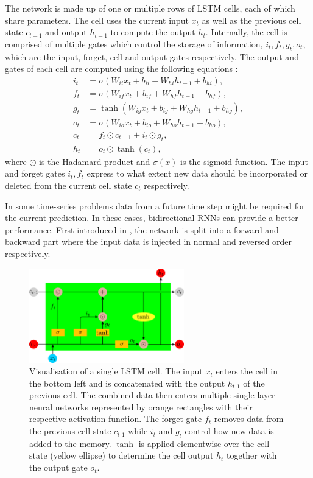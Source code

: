 The network is made up of one or multiple rows of LSTM cells, each of which share parameters.
The cell uses the current input $x_t$ as well as the previous cell state $c_{t-1}$ and output $h_{t-1}$ to compute the output $h_t$.
Internally, the cell is comprised of multiple gates which control the storage of information, $i_t, f_t, g_t, o_t$, which are the input, forget, cell and output gates respectively.
The output and gates of each cell are computed using the following equations \cite{NEURIPS2019_9015}:
\begin{align*}
i_t & = \sigma (W_{ii} x_t + b_{ii} + W_{hi} h_{t-1} + b_{hi}), \\
f_t & = \sigma (W_{if} x_t + b_{if} + W_{hf} h_{t-1} + b_{hf}), \\
g_t & = \tanh (W_{ig} x_t + b_{ig} + W_{hg} h_{t-1} + b_{hg}), \\ 
o_t & = \sigma (W_{io} x_t + b_{io} + W_{ho} h_{t-1} + b_{ho}), \\
c_t & = f_t \odot c_{t-1} + i_t \odot g_t, \\
h_t & = o_t \odot \tanh (c_t),
\end{align*}
where $\odot$ is the Hadamard product and $\sigma(x)$ is the sigmoid function.
The input and forget gates $i_t, f_t$ express to what extent new data should be incorporated or deleted from the current cell state $c_t$ respectively.

In some time-series problems data from a future time step might be required for the current prediction.
In these cases, bidirectional RNNs can provide a better performance.
First introduced in \cite{bidirrnn}, the network is split into a forward and backward part where the input data is injected in normal and reversed order respectively.

\begin{figure}
	\centering
	\includegraphics[width=0.6\textwidth]{img/lstm}
	\caption{Visualisation of a single LSTM cell. The input $x_t$ enters the cell in the bottom left and is concatenated with the output $h_{t\text{-}1}$ of the previous cell. The combined data then enters multiple single-layer neural networks represented by orange rectangles with their respective activation function. The forget gate $f_t$ removes data from the previous cell state $c_{t\text{-}1}$ while $i_t$ and $g_t$ control how new data is added to the memory. $\tanh$ is applied elementwise over the cell state (yellow ellipse) to determine the cell output $h_t$ together with the output gate $o_t$.}
	\label{lstm}
\end{figure}

